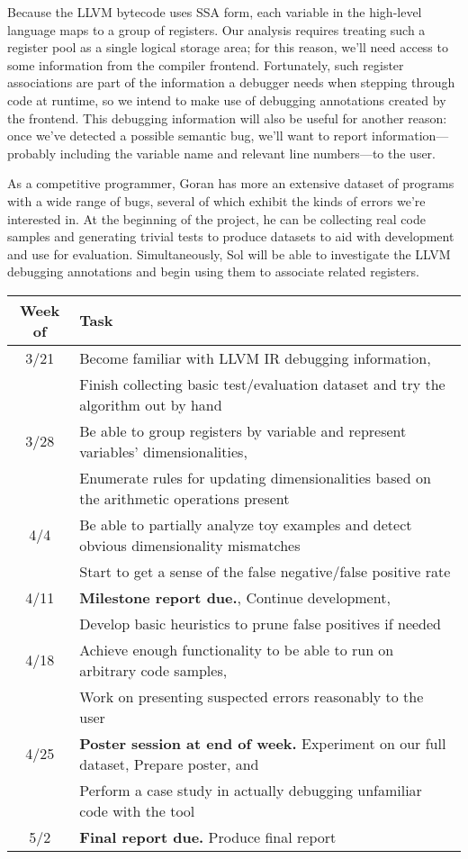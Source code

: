 \documentclass[12pt]{article}
\begin{document}
Because the LLVM bytecode uses SSA form, each variable in the high-level language maps to a group of registers.
Our analysis requires treating such a register pool as a single logical storage area; for this reason, we'll need access to some information from the compiler frontend.
Fortunately, such register associations are part of the information a debugger needs when stepping through code at runtime, so we intend to make use of debugging annotations created by the frontend.
This debugging information will also be useful for another reason: once we've detected a possible semantic bug, we'll want to report information---probably including the variable name and relevant line numbers---to the user.

As a competitive programmer, Goran has more an extensive dataset of programs with a wide range of bugs, several of which exhibit the kinds of errors we're interested in.
At the beginning of the project, he can be collecting real code samples and generating trivial tests to produce datasets to aid with development and use for evaluation.
Simultaneously, Sol will be able to investigate the LLVM debugging annotations and begin using them to associate related registers.

\begin{tabular}{c | l}
Week of & Task \\
\hline
3/21 & Become familiar with LLVM IR debugging information, \\
& Finish collecting basic test/evaluation dataset and try the algorithm out by hand \\
3/28 & Be able to group registers by variable and represent variables' dimensionalities, \\
& Enumerate rules for updating dimensionalities based on the arithmetic operations present \\
4/4 & Be able to partially analyze toy examples and detect obvious dimensionality mismatches \\
& Start to get a sense of the false negative/false positive rate \\
4/11 & \textbf{Milestone report due.}, Continue development, \\
& Develop basic heuristics to prune false positives if needed \\
4/18 & Achieve enough functionality to be able to run on arbitrary code samples, \\
& Work on presenting suspected errors reasonably to the user \\
4/25 & \textbf{Poster session at end of week.} Experiment on our full dataset, Prepare poster, and \\
& Perform a case study in actually debugging unfamiliar code with the tool \\
5/2 & \textbf{Final report due.} Produce final report
\end{tabular}
\end{document}
